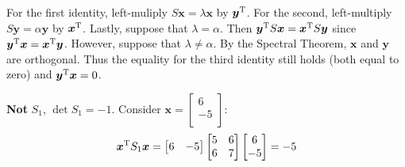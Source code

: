 \documentclass[a4paper]{article}
\begin{document}
For the first identity, left-muliply \(S \bm{x} = \lambda \bm{x}\) by \(\bm{y}^{\textsc{T}}\). For the second, left-multiply \(S \bm{y} = \alpha \bm{y}\) by \(\bm{x}^{\textsc{T}}\). Lastly, suppose that \(\lambda  = \alpha \). Then \(\bm{y}^{\textsc{T}}S \bm{x} = \bm{x}^{\textsc{T}} S \bm{y}\) since \(\bm{y}^{\textsc{T}}\bm{x} = \bm{x}^{\textsc{T}}\bm{y}\). However, suppose that \(\lambda \neq \alpha \). By the Spectral Theorem, \(\bm{x}\) and \(\bm{y}\) are orthogonal. Thus the equality for the third identity still holds (both equal to zero) and \(\bm{y}^{\textsc{T}}\bm{x} = 0\).

\vspace{12pt}


\textbf{Not} \(S_{1}\), \(\det S_{1} = -1\). Consider \(\bm{x} = 
\begin{bmatrix}
	6 \\
	-5 \\
\end{bmatrix}\):
\[
	\bm{x}^{\textsc{T}}S_{1}\bm{x} =
	\begin{bmatrix}
		6 & -5 \\
	\end{bmatrix}
	\begin{bmatrix}
		5 & 6 \\
		6 & 7 \\
	\end{bmatrix}
	\begin{bmatrix}
		6 \\
		-5 \\
	\end{bmatrix}
	= -5
\]
\end{document}
